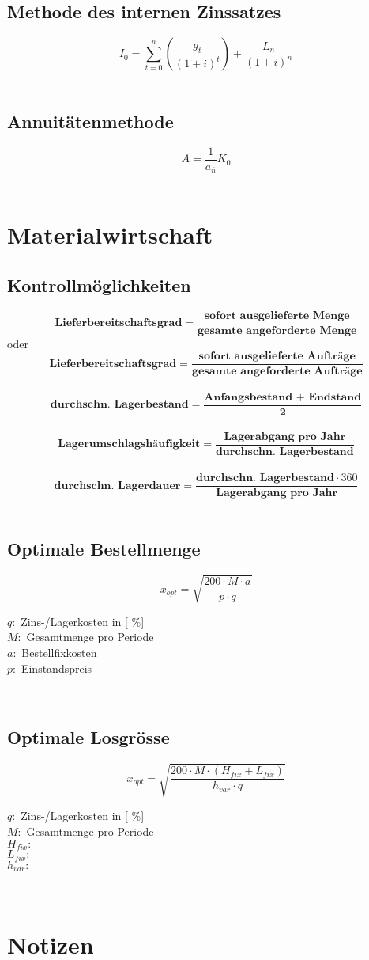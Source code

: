 \section{Methode des internen Zinssatzes}
\[
	I_0=\sum_{t=0}^{n}\left( \frac{g_t}{\left( 1+i\right) ^t} \right) + \frac{L_n}{\left( 1+i\right) ^n}
\]
\\
\section{Annuitätenmethode}
\[
	A=\frac{1}{a_{\bar{n}}}K_0
\]
\\
\chapter{Materialwirtschaft}
\section{Kontrollmöglichkeiten}
\[
		\textbf{Lieferbereitschaftsgrad}=\frac{\textbf{sofort ausgelieferte Menge}}{\textbf{gesamte angeforderte Menge}}
\]
oder\\
\[
		\textbf{Lieferbereitschaftsgrad}=\frac{\textbf{sofort ausgelieferte Aufträge}}{\textbf{gesamte angeforderte Aufträge}}
\]
\\
\[
		\textbf{durchschn. Lagerbestand}=\frac{\textbf{Anfangsbestand + Endstand}}{\textbf{2}}
\]
\\
\[
		\textbf{Lagerumschlagshäufigkeit}=\frac{\textbf{Lagerabgang pro Jahr}}{\textbf{durchschn. Lagerbestand}}
\]
\\
\[
		\textbf{durchschn. Lagerdauer}=\frac{\textbf{durchschn. Lagerbestand}\cdot 360}{\textbf{Lagerabgang pro Jahr}}
\]
\\
\section{Optimale Bestellmenge}
\[
	x_{opt}=\sqrt{\frac{200\cdot M\cdot a}{p\cdot q}}
\]
\begin{footnotesize}
	$q:$ Zins-/Lagerkosten in [ \%]\\
	$M:$ Gesamtmenge pro Periode\\
	$a:$ Bestellfixkosten\\
	$p:$ Einstandspreis\\
\end{footnotesize}
\\
\section{Optimale Losgrösse}
\[
	x_{opt}=\sqrt{\frac{200\cdot M\cdot \left( H_{fix}+L_{fix} \right)}{h_{var}\cdot q}}
\]
\begin{footnotesize}
	$q:$ Zins-/Lagerkosten in [ \%]\\
	$M:$ Gesamtmenge pro Periode\\
	$H_{fix}:$ \\
	$L_{fix}:$ \\
	$h_{var}:$ 
\end{footnotesize}
\
\\
\chapter{Notizen}
\cleardoublepage
